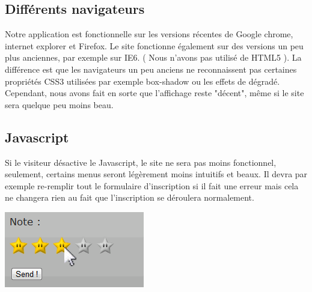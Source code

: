 \subsection{Différents navigateurs}

	Notre application est fonctionnelle sur les versions récentes de Google chrome, internet explorer et Firefox. Le site fonctionne également sur des versions un peu plus anciennes, par exemple sur IE6. ( Nous n'avons pas utilisé de HTML5 ). La différence est que les navigateurs un peu anciens ne reconnaissent pas certaines propriétés CSS3 utilisées par exemple box-shadow ou les effets de dégradé. Cependant, nous avons fait en sorte que l'affichage reste "décent", même si le site sera quelque peu moins beau.

\subsection{Javascript}

	Si le visiteur désactive le Javascript, le site ne sera pas moins fonctionnel, seulement, certains menus seront légèrement moins intuitifs et beaux. Il devra par exemple re-remplir tout le formulaire d'inscription si il fait une erreur mais cela ne changera rien au fait que l'inscription se déroulera normalement.
	
\includegraphics[scale=1]{Images/exemplejs.png}